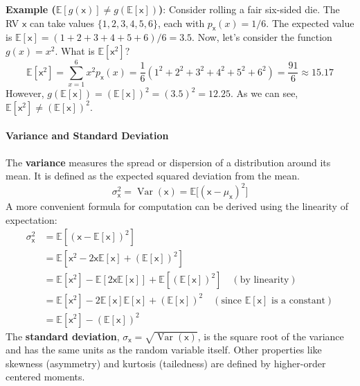 \begin{exampleBox}
    \textbf{Example ($\mathbb{E}[g(\mathsf{x})] \neq g(\mathbb{E}[\mathsf{x}])$)}: Consider rolling a fair six-sided die. The RV $\mathsf{x}$ can take values $\{1, 2, 3, 4, 5, 6\}$, each with $p_{\mathsf{x}}(x)=1/6$. The expected value is $\mathbb{E}[\mathsf{x}] = (1+2+3+4+5+6)/6 = 3.5$.
    Now, let's consider the function $g(x) = x^2$. What is $\mathbb{E}[\mathsf{x}^2]$?
    $$ \mathbb{E}[\mathsf{x}^2] = \sum_{x=1}^{6} x^2 p_{\mathsf{x}}(x) = \frac{1}{6}(1^2 + 2^2 + 3^2 + 4^2 + 5^2 + 6^2) = \frac{91}{6} \approx 15.17 $$
    However, $g(\mathbb{E}[\mathsf{x}]) = (\mathbb{E}[\mathsf{x}])^2 = (3.5)^2 = 12.25$. As we can see, $\mathbb{E}[\mathsf{x}^2] \neq (\mathbb{E}[\mathsf{x}])^2$.
\end{exampleBox}

\paragraph*{Variance and Standard Deviation}
The \textbf{variance} measures the spread or dispersion of a distribution around its mean. It is defined as the expected squared deviation from the mean.
\begin{equation}
    \sigma_{\mathsf{x}}^2 = \operatorname{Var}(\mathsf{x}) = \mathbb{E}\big[(\mathsf{x} - \mu_{\mathsf{x}})^2\big]
\end{equation}
A more convenient formula for computation can be derived using the linearity of expectation:
\begin{align}
    \sigma_{\mathsf{x}}^2 &= \mathbb{E}[(\mathsf{x} - \mathbb{E}[\mathsf{x}])^2] \nonumber \\
    &= \mathbb{E}[\mathsf{x}^2 - 2\mathsf{x}\mathbb{E}[\mathsf{x}] + (\mathbb{E}[\mathsf{x}])^2] \nonumber\\
    &= \mathbb{E}[\mathsf{x}^2] - \mathbb{E}[2\mathsf{x}\mathbb{E}[\mathsf{x}]] + \mathbb{E}[(\mathbb{E}[\mathsf{x}])^2] \quad (\text{by linearity}) \nonumber\\
    &= \mathbb{E}[\mathsf{x}^2] - 2\mathbb{E}[\mathsf{x}]\mathbb{E}[\mathsf{x}] + (\mathbb{E}[\mathsf{x}])^2 \quad (\text{since } \mathbb{E}[\mathsf{x}] \text{ is a constant}) \nonumber\\
    &= \mathbb{E}[\mathsf{x}^2] - (\mathbb{E}[\mathsf{x}])^2
\end{align}
The \textbf{standard deviation}, $\sigma_{\mathsf{x}} = \sqrt{\operatorname{Var}(\mathsf{x})}$, is the square root of the variance and has the same units as the random variable itself. Other properties like skewness (asymmetry) and kurtosis (tailedness) are defined by higher-order centered moments.

